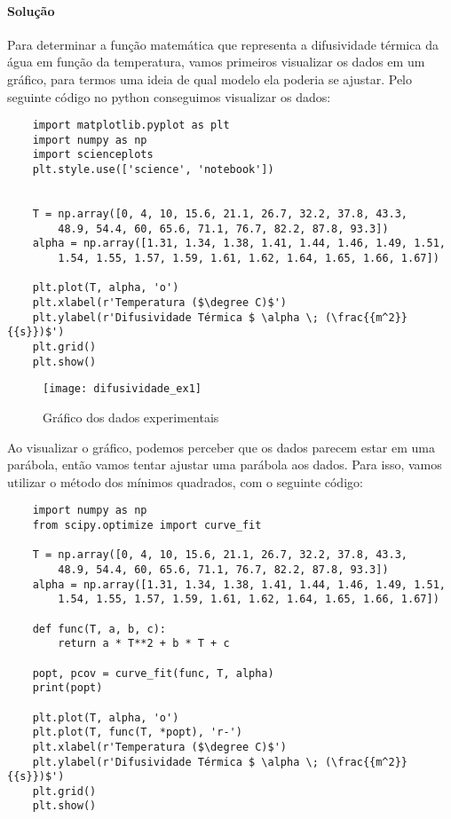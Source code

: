 \paragraph{Solução}
Para determinar a função matemática que representa a difusividade térmica da água em função da
temperatura, vamos primeiros visualizar os dados em um gráfico, para termos uma ideia de qual modelo
ela poderia se ajustar. Pelo seguinte código no python conseguimos visualizar os dados:  
\begin{verbatim}
    import matplotlib.pyplot as plt
    import numpy as np
    import scienceplots
    plt.style.use(['science', 'notebook'])


    T = np.array([0, 4, 10, 15.6, 21.1, 26.7, 32.2, 37.8, 43.3,
        48.9, 54.4, 60, 65.6, 71.1, 76.7, 82.2, 87.8, 93.3])
    alpha = np.array([1.31, 1.34, 1.38, 1.41, 1.44, 1.46, 1.49, 1.51,
        1.54, 1.55, 1.57, 1.59, 1.61, 1.62, 1.64, 1.65, 1.66, 1.67])

    plt.plot(T, alpha, 'o')
    plt.xlabel(r'Temperatura ($\degree C)$')
    plt.ylabel(r'Difusividade Térmica $ \alpha \; (\frac{{m^2}}{{s}})$')
    plt.grid()
    plt.show()
\end{verbatim}
\begin{figure}[H]
    \centering
    \texttt{[image: difusividade\_ex1]}
    \caption{Gráfico dos dados experimentais}
    \label{fig:grafico_dif_ex1}
\end{figure}
Ao visualizar o gráfico, podemos perceber que os dados parecem estar em uma parábola, então vamos
tentar ajustar uma parábola aos dados. Para isso, vamos utilizar o método dos mínimos quadrados,
com o seguinte código:
\begin{verbatim}
    import numpy as np
    from scipy.optimize import curve_fit

    T = np.array([0, 4, 10, 15.6, 21.1, 26.7, 32.2, 37.8, 43.3,
        48.9, 54.4, 60, 65.6, 71.1, 76.7, 82.2, 87.8, 93.3])
    alpha = np.array([1.31, 1.34, 1.38, 1.41, 1.44, 1.46, 1.49, 1.51,
        1.54, 1.55, 1.57, 1.59, 1.61, 1.62, 1.64, 1.65, 1.66, 1.67])

    def func(T, a, b, c):
        return a * T**2 + b * T + c

    popt, pcov = curve_fit(func, T, alpha)
    print(popt)

    plt.plot(T, alpha, 'o')
    plt.plot(T, func(T, *popt), 'r-')
    plt.xlabel(r'Temperatura ($\degree C)$')
    plt.ylabel(r'Difusividade Térmica $ \alpha \; (\frac{{m^2}}{{s}})$')
    plt.grid()
    plt.show()
\end{verbatim}
